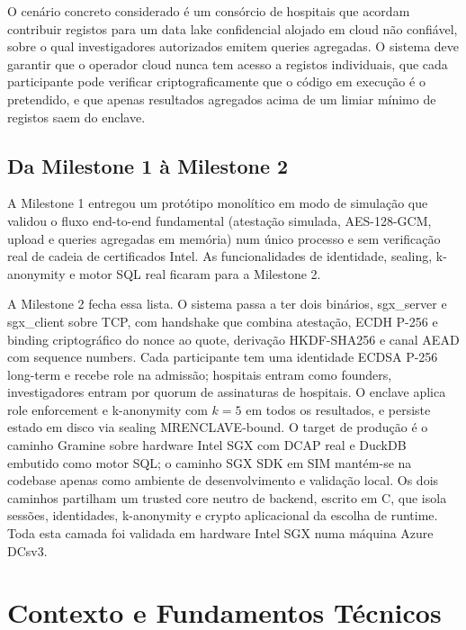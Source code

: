 O cenário concreto considerado é um consórcio de hospitais que acordam contribuir registos para um data lake confidencial alojado em cloud não confiável, sobre o qual investigadores autorizados emitem queries agregadas. O sistema deve garantir que o operador cloud nunca tem acesso a registos individuais, que cada participante pode verificar criptograficamente que o código em execução é o pretendido, e que apenas resultados agregados acima de um limiar mínimo de registos saem do enclave.

\subsection{Da Milestone 1 à Milestone 2}

A Milestone 1 entregou um protótipo monolítico em modo de simulação que validou o fluxo end-to-end fundamental (atestação simulada, AES-128-GCM, upload e queries agregadas em memória) num único processo e sem verificação real de cadeia de certificados Intel. As funcionalidades de identidade, sealing, k-anonymity e motor SQL real ficaram para a Milestone 2.

A Milestone 2 fecha essa lista. O sistema passa a ter dois binários, sgx\_server e sgx\_client sobre TCP, com handshake que combina atestação, ECDH P-256 e binding criptográfico do nonce ao quote, derivação HKDF-SHA256 e canal AEAD com sequence numbers. Cada participante tem uma identidade ECDSA P-256 long-term e recebe role na admissão; hospitais entram como founders, investigadores entram por quorum de assinaturas de hospitais. O enclave aplica role enforcement e k-anonymity com $k=5$ em todos os resultados, e persiste estado em disco via sealing MRENCLAVE-bound. O target de produção é o caminho Gramine sobre hardware Intel SGX com DCAP real e DuckDB embutido como motor SQL; o caminho SGX SDK em SIM mantém-se na codebase apenas como ambiente de desenvolvimento e validação local. Os dois caminhos partilham um trusted core neutro de backend, escrito em C, que isola sessões, identidades, k-anonymity e crypto aplicacional da escolha de runtime. Toda esta camada foi validada em hardware Intel SGX numa máquina Azure DCsv3.

\section{Contexto e Fundamentos Técnicos}


